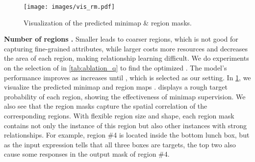 \documentclass[10pt,twocolumn,letterpaper]{article}
\begin{document}
\begin{figure}[t]
\vspace{-0.05in}
  \begin{center}
     \texttt{[image: images/vis\_rm.pdf]}
  \end{center}
 \vspace{-0.25in}
  \caption{Visualization of the predicted minimap \& region masks.}
  \vspace{-0.2in}
  \label{fig:vis_rm}
\end{figure}
\textbf{Number of regions .} 
Smaller  leads to coarser regions, which is not good for capturing fine-grained attributes, while larger  costs more resources and decreases the area of each region, making relationship learning difficult. We do experiments on the selection of  in \cref{tab:ablation_q} to find the optimized . The model's performance improves as  increases until , which is selected as our setting.
In \cref{fig:vis_rm}, we visualize the predicted minimap  and region maps .  displays a rough target probability of each region, showing the effectiveness of minimap supervision. We also see that the region masks capture the spatial correlation of the corresponding regions. With flexible region size and shape, each region mask 
contains not only the instance of this region but also other instances with strong relationships. For example, region \#4 is located inside the bottom lunch box, but as the input expression tells that all three boxes are targets, the top two also cause some responses in the output mask of region \#4.
\end{document}
